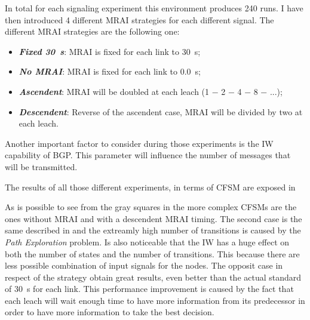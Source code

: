 \begin{table}[h]
	
	\caption{Fabrikant experiments environment}
	\label{tbl:fabrikant_environment}
\end{table}

In total for each signaling experiment this environment produces \num{240} runs.
I have then introduced \num{4} different \ac{MRAI} strategies for each different
signal.
The different \ac{MRAI} strategies are the following one:
\begin{itemize}
	\item \textbf{\textit{Fixed \SI{30}{\second}}}: \ac{MRAI} is fixed for each link to \SI{30}{\second};
	\item \textbf{\textit{No \ac{MRAI}}}: \ac{MRAI} is fixed for each link to \SI{0.0}{\second};
	\item \textbf{\textit{Ascendent}}: \ac{MRAI} will be doubled at each leach (1 − 2 − 4 − 8 − ...);
	\item \textbf{\textit{Descendent}}: Reverse of the ascendent case, \ac{MRAI} will be divided by two at each leach.
\end{itemize}

Another important factor to consider during those experiments is the \ac{IW}
capability of \ac{BGP}.
This parameter will influence the number of messages
that will be transmitted.

The results of all those different experiments, in terms of \ac{CFSM} are
exposed in 

\begin{table}[h]
	
	\caption{Fabrikant \ac{CFSM}s results, $|S|$ is the dimension of the states set
		$|T|$ is the dimension of the transitions set, The worst results for each
		category are colored in gray, the topology contains \num{3} rings, as
		}
	\label{tbl:fabrikant_cfsm}
\end{table}

As is possible to see from the gray squares in  the more
complex \ac{CFSM}s are the ones without \ac{MRAI} and with a descendent \ac{MRAI}
timing.
The second case is the same described in \cite{fabrikant2011there} and the extreamly
high number of transitions is caused by the \textit{Path Exploration} problem.
Is also noticeable that the \ac{IW} has a huge effect on both the number
of states and the number of transitions.
This because there are less possible combination of input signals for the nodes.
The opposit case in respect of the  strategy obtain
great results, even better than the actual standard of \SI{30}{\second} for
each link.
This performance improvement is caused by the fact that each leach will wait
enough time to have more information from its predecessor in order to have
more information to take the best decision.

